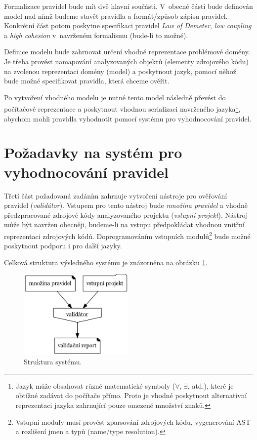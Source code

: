 Formalizace pravidel bude mít dvě hlavní součásti. V~obecné části bude definován model nad nímž budeme stavět pravidla a formát/způsob zápisu pravidel. Konkrétní část potom poskytne specifikaci pravidel \emph{Law of Demeter}, \emph{low coupling} a \emph{high cohesion} v~navrženém formalismu (bude-li to možné).

Definice modelu bude zahrnovat určení vhodné reprezentace problémové domény. Je třeba provést namapování analyzovaných objektů (elementy zdrojového kódu) na zvolenou reprezentaci domény (model) a poskytnout jazyk, pomocí něhož bude možné specifikovat pravidla, která chceme ověřit.

Po vytvoření vhodného modelu je nutné tento model následně převést do počítačové reprezentace a poskytnout vhodnou serializaci navrženého jazyka\footnote{Jazyk může obsahovat různé matematické symboly ($\forall$, $\exists$, atd.), které je obtížné zadávat do počítače přímo. Proto je vhodné poskytnout alternativní reprezentaci jazyka zahrnující pouze omezené množství znaků.}, abychom mohli pravidla vyhodnotit pomocí systému pro vyhodnocování pravidel.

\section{Požadavky na systém pro vyhodnocování pravidel}
\label{requirements-rules_evaluation}
Třetí část požadovaná zadáním zahrnuje vytvoření nástroje pro ověřování pravidel (\emph{validátor}). Vstupem pro tento nástroj bude \emph{množina pravidel} a vhodně předzpracované zdrojové kódy analyzovaného projektu (\emph{vstupní projekt}). Nástroj může být navržen obecněji, budeme-li na vstupu předpokládat vhodnou vnitřní reprezentaci zdrojových kódů. Doprogramováním vstupních modulů\footnote{Vstupní moduly musí provést zparsování zdrojových kódu, vygenerování AST a rozlišení jmen a typů (name/type resolution).} bude možné poskytnout podporu i pro další jazyky.

Celková struktura výsledného systému je znázorněna na obrázku \ref{requirements-system_structure}.

\begin{figure}[h!]
  \centering
  \includegraphics[width=0.5\textwidth]{./graphs/global_structure.png}
  \caption{Struktura systému.\label{requirements-system_structure}}
\end{figure}


